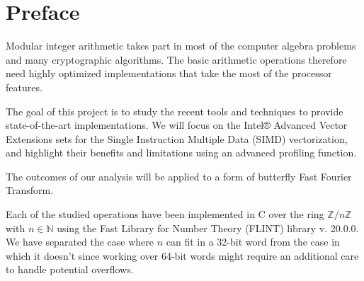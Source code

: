 \documentclass[a4paper]{article}
\begin{document}
%
%
\section{Preface}

Modular integer arithmetic takes part in most of the computer algebra problems and many
cryptographic algorithms. The basic arithmetic operations therefore need highly optimized implementations
that take the most of the processor features.

The goal of this project is to study the recent tools and techniques to provide state-of-the-art implementations.
We will focus on the Intel® Advanced Vector Extensions sets for the Single Instruction Multiple Data (SIMD) vectorization,
and highlight their benefits and limitations using an advanced profiling function.

The outcomes of our analysis will be applied to a form of butterfly Fast Fourier Transform.

\bigskip
Each of the studied operations have been implemented in C over the ring $\mathbb{Z}/n\mathbb{Z}$ with $n \in \mathbb{N}$
using the Fast Library for Number Theory (FLINT) library v. 20.0.0.
We have separated the case where $n$ can fit in a 32-bit word from the case in which it doesn't 
since working over 64-bit words might require an additional care to handle potential overflows.
\end{document}
